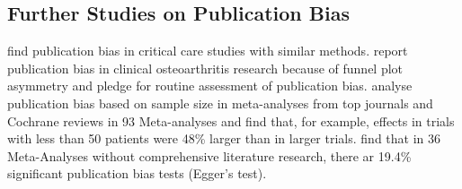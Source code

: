 \documentclass[11pt,a4paper,twoside]{book}\usepackage[]{graphicx}\usepackage[]{color}
\begin{document}
\subsection{Further Studies on Publication Bias}
\citet{Zhang.2013} find publication bias in critical care studies with similar methods. \citet{Nusch} report publication bias in clinical osteoarthritis research because of funnel plot asymmetry and pledge for routine assessment of publication bias. \citet{Dechartres.2013} analyse publication bias based on sample size in meta-analyses from top journals and Cochrane reviews in 93 Meta-analyses and find that, for example, effects in trials with less than 50 patients were 48\% larger than in larger trials. \citet{Onishi.2014} find that in 36 Meta-Analyses without comprehensive literature research, there ar 19.4\% significant publication bias tests (Egger's test).
\end{document}
